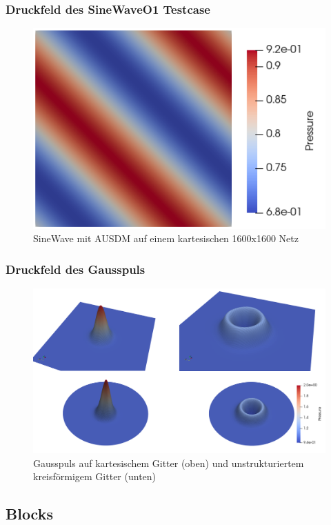 \documentclass[
	11pt, %
	aspectratio=169, %
]{beamer}
\begin{document}
\begin{frame}
	\frametitle{Druckfeld des SineWaveO1 Testcase}
	
	\begin{figure}
		\includegraphics[width=0.7\linewidth]{SineWaveO1AUSMD_1600x1600.png}
		\caption{SineWave mit AUSDM auf einem kartesischen 1600x1600 Netz}
	\end{figure}
\end{frame}

\begin{frame}
\frametitle{Druckfeld des Gausspuls}

\begin{figure}
	\includegraphics[width=0.7\linewidth]{gausspulse_collage.png}
	\caption{Gausspuls auf kartesischem Gitter (oben) und unstrukturiertem kreisförmigem Gitter (unten)}
\end{figure}
\end{frame}


\subsection{Blocks}
\end{document}
